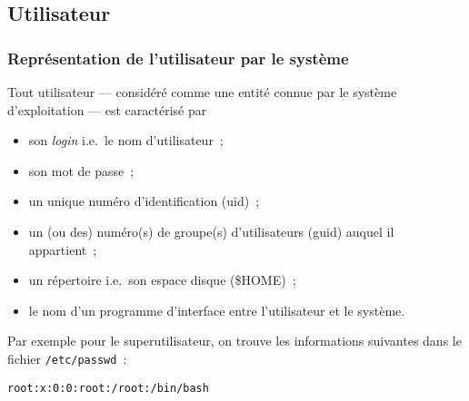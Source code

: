 \subsection{Utilisateur}
\begin{frame}[fragile]
  \frametitle{Repr\'esentation de l'utilisateur par le syst\`eme}%
  Tout utilisateur --- consid\'er\'e comme une entit\'e connue par le
  syst\`eme d'exploitation --- est caract\'eris\'e par
  \begin{itemize}
  \item son \textit{login} i.e.\ le nom d'utilisateur~;
  \item son mot de passe~;
  \item un unique num\'ero d'identification (uid)~;
  \item un (ou des) num\'ero(s) de groupe(s) d'utilisateurs (guid) auquel
  il appartient~;
  \item un r\'epertoire i.e.\ son espace disque (\$HOME)~;
  \item le nom d'un programme d'interface entre l'utilisateur et le
  syst\`eme.
  \end{itemize}
  \par\medskip
  Par exemple pour le superutilisateur, on trouve les informations
  suivantes dans le fichier \texttt{/etc/passwd}~:
  \begin{verbatim}
root:x:0:0:root:/root:/bin/bash
\end{verbatim}
\end{frame}
